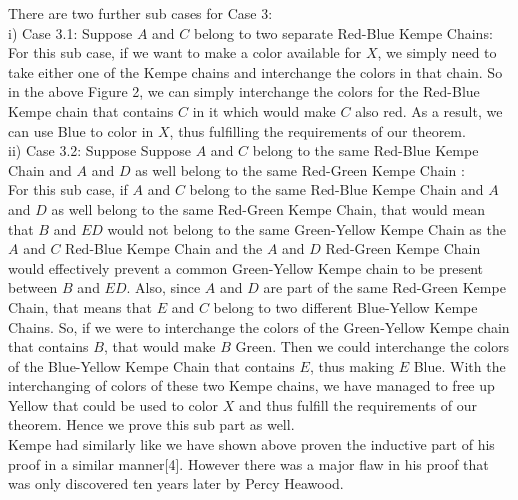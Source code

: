 \documentclass[11pt]{article}
\newcommand{\forceindent}{\leavevmode{\parindent=1.5em\indent}}
\begin{document}
 There are two further sub cases for Case 3:\\
 \forceindent \forceindent i) Case 3.1: Suppose $A$ and $C$ belong to two separate Red-Blue Kempe Chains:\\
\forceindent \forceindent For this sub case, if we want to make a color available for $X$, we simply need to take \forceindent \forceindent either one of the Kempe chains and interchange the colors in that chain. So in the \forceindent \forceindent above Figure 2, we can simply interchange the colors for the Red-Blue Kempe chain that \forceindent \forceindent contains $C$ in it which would make $C$ also red. As a result, we can use Blue to color in \forceindent \forceindent $X$, thus fulfilling the requirements of our theorem. \\
 \forceindent \forceindent ii) Case 3.2: Suppose Suppose $A$ and $C$ belong to the same Red-Blue Kempe Chain and \forceindent \forceindent $A$ and $D$ as well belong to the same Red-Green Kempe Chain :\\
 \forceindent \forceindent  For this sub case, if $A$ and $C$ belong to the same Red-Blue Kempe Chain and $A$ and \forceindent \forceindent $D$ as well belong to the same Red-Green Kempe Chain, that would mean that $B$ and \forceindent \forceindent $ED$ would not belong to the same Green-Yellow Kempe Chain as the $A$ and $C$ Red-Blue \forceindent \forceindent Kempe Chain and the $A$ and $D$ Red-Green Kempe Chain would effectively prevent a \forceindent \forceindent common Green-Yellow Kempe chain to be present between $B$ and $ED$. Also, since $A$  \forceindent \forceindent and $D$ are part of the same Red-Green Kempe Chain, that means that $E$ and $C$ belong  \forceindent \forceindent to two different Blue-Yellow Kempe Chains. So, if we were to interchange the colors  \forceindent \forceindent of  the Green-Yellow Kempe chain that contains $B$, that would make $B$ Green. Then  \forceindent \forceindent we could interchange the colors of the Blue-Yellow Kempe Chain that contains $E$, thus  \forceindent \forceindent making $E$ Blue. With the interchanging of colors of these two Kempe chains, we have  \forceindent \forceindent managed to free up Yellow that could be used to color $X$ and thus fulfill the requirements  \forceindent \forceindent of our theorem. Hence we prove this sub part as well.\\
 
 \noindent Kempe had similarly like we have shown above proven the inductive part of his proof in a similar manner[4]. However there was a major flaw in his proof that was only discovered ten years later by Percy Heawood.\\
 
\end{document}
